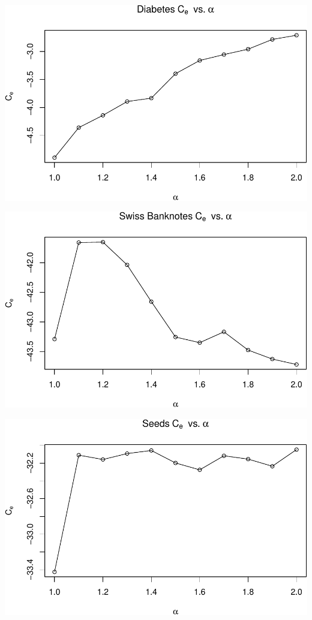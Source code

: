 \documentclass[]{article}
\begin{document}
\begin{center}\includegraphics[width=1\linewidth]{Report_files/figure-latex/unnamed-chunk-20-3} \end{center}

\begin{center}\includegraphics[width=1\linewidth]{Report_files/figure-latex/unnamed-chunk-20-4} \end{center}

\begin{center}\includegraphics[width=1\linewidth]{Report_files/figure-latex/unnamed-chunk-20-5} \end{center}
\end{document}
